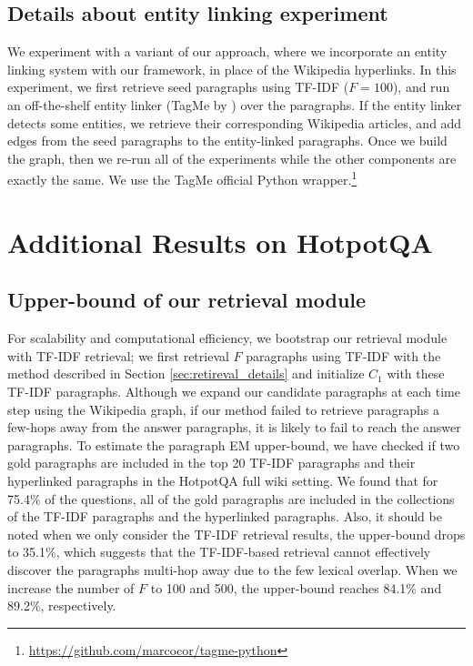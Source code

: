 \subsection{Details about entity linking experiment}
\label{subsec:appendix_entity_linking}

We experiment with a variant of our approach, where we incorporate an entity linking system with our framework, in place of the Wikipedia hyperlinks. 
In this experiment, we first retrieve seed paragraphs using TF-IDF ($F = 100$), and run an off-the-shelf entity linker (TagMe by \cite{ferragina2011fast}) over the paragraphs. If the entity linker detects some entities, we retrieve their corresponding Wikipedia articles, and add edges from the seed paragraphs to the entity-linked paragraphs.
Once we build the graph, then we re-run all of the experiments while the other components are exactly the same. 
We use the TagMe official Python wrapper.\footnote{\url{https://github.com/marcocor/tagme-python}}

\section{Additional Results on HotpotQA}
\subsection{Upper-bound of our retrieval module}
For scalability and computational efficiency, we bootstrap our retrieval module with TF-IDF retrieval; we first retrieval $F$ paragraphs using TF-IDF with the method described in Section \ref{sec:retireval_details} and initialize $C_1$ with these TF-IDF paragraphs.
Although we expand our candidate paragraphs at each time step using the Wikipedia graph, if our method failed to retrieve paragraphs a few-hops away from the answer paragraphs, it is likely to fail to reach the answer paragraphs. 
To estimate the paragraph EM upper-bound, we have checked if two gold paragraphs are included in the top 20 TF-IDF paragraphs and their hyperlinked paragraphs in the HotpotQA full wiki setting.
We found that for 75.4\% of the questions, all of the gold paragraphs are included in the collections of the TF-IDF paragraphs and the hyperlinked paragraphs. 
Also, it should be noted when we only consider the TF-IDF retrieval results, the upper-bound drops to 35.1\%, which suggests that the TF-IDF-based retrieval cannot effectively discover the paragraphs multi-hop away due to the few lexical overlap. 
When we increase the number of $F$ to 100 and 500, the upper-bound reaches 84.1\% and 89.2\%, respectively. 

